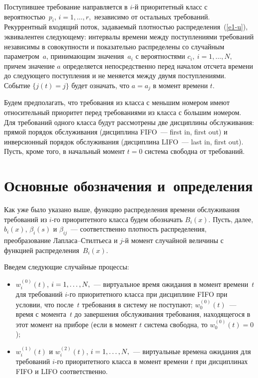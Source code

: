 \begin{multicols}{2}
Поступившее требование направляется в $i$-й приоритетный класс с вероятностью~$p_i$, 
$i=1,\ldots , r,$ независимо от остальных требований.
Рекуррентный входящий поток, задаваемый плотностью распределения~(\ref{e1-u}), 
эквивалентен следующему: интервалы времени между поступлениями
требований независимы в совокупности и показательно распределены 
со случайным параметром~$a$, принимающим значения~$a_i$ с вероятностями $c_i,\
i=1,\ldots,N,$ причем значение $a$ определяется непосредственно перед началом 
отсчета времени до следующего поступления и не меняется между двумя поступлениями. 
Событие $\{j(t)=j\}$ будет означать, что $a=a_j$ в момент времени $t.$

Будем предполагать, что требования из класса с меньшим номером имеют относительный 
приоритет перед требованиями из класса с б$\acute{\mbox{о}}$льшим номером.  Для 
требований одного класса будут рассмотрены две дисциплины обслуживания: прямой порядок 
обслуживания (дисциплина FIFO~--- first in, first out) и инверсионный порядок обслуживания (дисциплина LIFO~---
last in, first out). 
Пусть, кроме того, в начальный момент $t=0$ система свободна от требований.

\section{Основные обозначения и~определения}

Как уже было указано выше, функцию распределения времени обслуживания требований из $i$-го 
приоритетного класса будем обозначать $B_i(x)$. 
%
Пусть, далее, 
$b_i(x)$, $\beta_i(s)$ и $\beta_{ij}$~--- соответственно плотность распределения, 
преобразование Лапласа--Стилтьеса и $j$-й момент случайной величины с функцией 
распределения~$B_i(x).$

Введем следующие случайные процессы:
\begin{itemize}
\item
$w_i^{(0)}(t)$,  $i\hm=1,\ldots,N,$~--- виртуальное время ожидания в момент времени~$t$ для 
требований $i$-го приоритетного класса при дисциплине FIFO при условии, 
что после~$t$ требования 
в систему не поступают; $w_0^{(0)}(t)$~--- время с момента~$t$ до завершения обслуживания 
требования, находящегося в
этот момент на приборе (если в момент $t$ система свободна, то $w_0^{(0)}(t)=0$);
\item
$w_i^{(1)}(t)$ и $w_i^{(2)}(t)$, $i\hm=1,\ldots,N,$~--- виртуальные времена ожидания для 
требований $i$-го приоритетного класса в момент времени $t$  при
дисциплинах FIFO и LIFO соответственно.
\end{itemize}


\end{multicols}
